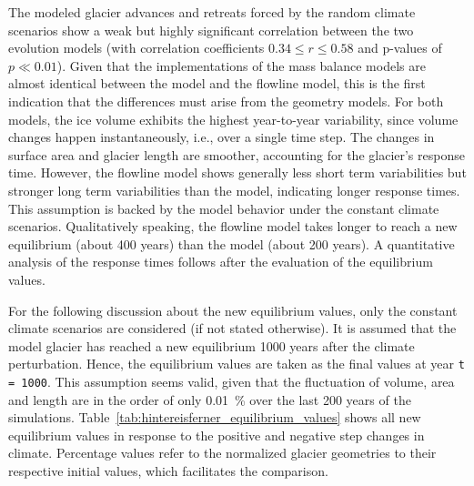     The modeled glacier advances and retreats forced by the random climate scenarios show a weak but highly significant correlation between the two evolution models (with correlation coefficients $0.34 \leq r \leq 0.58$ and p-values of $p \ll 0.01$). Given that the implementations of the mass balance models are almost identical between the \vas{} model and the flowline model, this is the first indication that the differences must arise from the geometry models. For both models, the ice volume exhibits the highest year-to-year variability, since volume changes happen instantaneously, i.e., over a single time step. The changes in surface area and glacier length are smoother, accounting for the glacier's response time. However, the flowline model shows generally less short term variabilities but stronger long term variabilities than the \vas{} model, indicating longer response times. This assumption is backed by the model behavior under the constant climate scenarios. Qualitatively speaking, the flowline model takes longer to reach a new equilibrium (about 400 years) than the \vas{} model (about 200 years). A quantitative analysis of the response times follows after the evaluation of the equilibrium values. 


    For the following discussion about the new equilibrium values, only the constant climate scenarios are considered (if not stated otherwise). It is assumed that the model glacier has reached a new equilibrium 1000 years after the climate perturbation. Hence, the equilibrium values are taken as the final values at year \lstinline`t = 1000`. This assumption seems valid, given that the fluctuation of volume, area and length are in the order of only \SI{0.01}{\percent}\footnotemark{} over the last 200 years of the simulations.
    Table~\ref{tab:hintereisferner_equilibrium_values} shows all new equilibrium values in response to the positive and negative step changes in climate. Percentage values refer to the normalized glacier geometries to their respective initial values, which facilitates the comparison.
    
